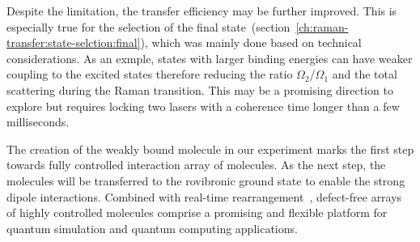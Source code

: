 Despite the limitation, the transfer efficiency may be further improved.
This is especially true for the selection
of the final state~(section~\ref{ch:raman-transfer:state-selction:final}),
which was mainly done based on technical considerations.
As an exmple, states with larger binding energies can have weaker coupling
to the excited states therefore reducing the ratio $\Omega_2/\Omega_1$
and the total scattering during the Raman transition.
This may be a promising direction to explore
but requires locking two lasers with a coherence time longer than a few milliseconds.

The creation of the weakly bound molecule in our experiment marks
the first step towards fully controlled interaction array of molecules.
As the next step, the molecules will be transferred to the rovibronic ground state
to enable the strong dipole interactions.
Combined with real-time rearrangement~\cite{barredo_atom-by-atom_2016,endres_atom-by-atom_2016},
defect-free arrays of highly controlled molecules comprise a promising
and flexible platform for quantum simulation and quantum computing applications.
